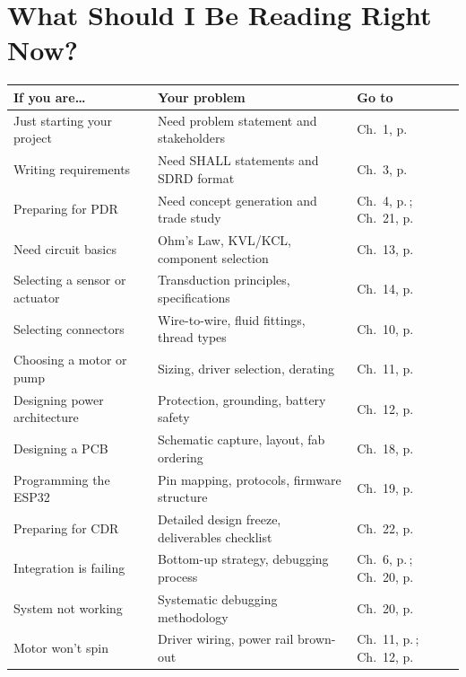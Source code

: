 \chapter*{What Should I Be Reading Right Now?}

\begin{center}\small
\begin{tabularx}{\textwidth}{l X l}
\toprule
\textbf{If you are\ldots} & \textbf{Your problem} & \textbf{Go to} \\
\midrule
Just starting your project & Need problem statement and stakeholders & Ch.~1, p.\,\pageref{ch:problem} \\
Writing requirements & Need SHALL statements and SDRD format & Ch.~3, p.\,\pageref{ch:requirements} \\
Preparing for PDR & Need concept generation and trade study & Ch.~4, p.\,\pageref{ch:concept}; Ch.~21, p.\,\pageref{ch:pdr} \\
Need circuit basics & Ohm's Law, KVL/KCL, component selection & Ch.~13, p.\,\pageref{ch:electronics} \\
Selecting a sensor or actuator & Transduction principles, specifications & Ch.~14, p.\,\pageref{ch:sensors} \\
Selecting connectors & Wire-to-wire, fluid fittings, thread types & Ch.~10, p.\,\pageref{ch:connectors} \\
Choosing a motor or pump & Sizing, driver selection, derating & Ch.~11, p.\,\pageref{ch:motors} \\
Designing power architecture & Protection, grounding, battery safety & Ch.~12, p.\,\pageref{ch:power} \\
Designing a PCB & Schematic capture, layout, fab ordering & Ch.~18, p.\,\pageref{ch:pcb} \\
Programming the ESP32 & Pin mapping, protocols, firmware structure & Ch.~19, p.\,\pageref{ch:mcu} \\
Preparing for CDR & Detailed design freeze, deliverables checklist & Ch.~22, p.\,\pageref{ch:cdr} \\
Integration is failing & Bottom-up strategy, debugging process & Ch.~6, p.\,\pageref{ch:integration}; Ch.~20, p.\,\pageref{ch:debug} \\
System not working & Systematic debugging methodology & Ch.~20, p.\,\pageref{ch:debug} \\
Motor won't spin & Driver wiring, power rail brown-out & Ch.~11, p.\,\pageref{ch:motors}; Ch.~12, p.\,\pageref{ch:power} \\

\end{tabularx}
\end{center}
